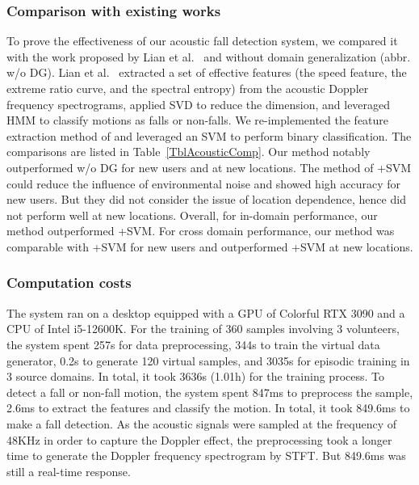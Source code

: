 \documentclass[journal]{IEEEtran}
\begin{document}
\subsubsection{Comparison with existing works}
To prove the effectiveness of our acoustic fall detection system, we compared it with the work proposed by Lian et al.~\cite{LianJ:2021} and without domain generalization (abbr. w/o DG). Lian et al.~\cite{LianJ:2021} extracted a set of effective features (the speed feature, the extreme ratio curve, and the spectral entropy) from the acoustic Doppler frequency spectrograms, applied SVD to reduce the dimension, and leveraged HMM to classify motions as falls or non-falls. We re-implemented the feature extraction method of \cite{LianJ:2021} and leveraged an SVM to perform binary classification. The comparisons are listed in Table~\ref{TblAcousticComp}. Our method notably outperformed w/o DG for new users and at new locations. The method of \cite{LianJ:2021}+SVM could reduce the influence of environmental noise and showed high accuracy for new users. But they did not consider the issue of location dependence, hence did not perform well at new locations. Overall, for in-domain performance, our method outperformed \cite{LianJ:2021}+SVM. For cross domain performance, our method was comparable with \cite{LianJ:2021}+SVM for new users and outperformed \cite{LianJ:2021}+SVM at new locations. 

\subsubsection{Computation costs}
The system ran on a desktop equipped with a GPU of Colorful RTX 3090 and a CPU of Intel i5-12600K. For the training of 360 samples involving 3 volunteers, the system spent 257s for data preprocessing, 344s to train the virtual data generator, 0.2s to generate 120 virtual samples, and 3035s for episodic training in 3 source domains. In total, it took 3636s (1.01h) for the training process. To detect a fall or non-fall motion, the system spent 847ms to preprocess the sample, 2.6ms to extract the features and classify the motion. In total, it took 849.6ms to make a fall detection. As the acoustic signals were sampled at the frequency of 48KHz in order to capture the Doppler effect, the preprocessing took a longer time to generate the Doppler frequency spectrogram by STFT. But 849.6ms was still a real-time response.
\end{document}
